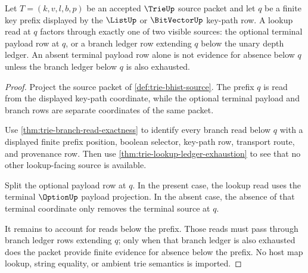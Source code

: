 \begin{theorem}\label{thm:trie-lookup-prefix-ledger-factorization}
Let $T=(k,v,l,b,p)$ be an accepted $\TrieUp$ source packet and let $q$ be a
finite key prefix displayed by the $\ListUp$ or $\BitVectorUp$ key-path row.
A lookup read at $q$ factors through exactly one of two visible sources: the
optional terminal payload row at $q$, or a branch ledger row extending $q$
below the unary depth ledger. An absent terminal payload row alone is not
evidence for absence below $q$ unless the branch ledger below $q$ is also
exhausted.
\end{theorem}
\begin{proof}
Project the source packet of \autoref{def:trie-bhist-source}. The prefix $q$
is read from the displayed key-path coordinate, while the optional terminal
payload and branch rows are separate coordinates of the same packet.

Use \autoref{thm:trie-branch-read-exactness} to identify every branch read
below $q$ with a displayed finite prefix position, boolean selector, key-path
row, transport route, and provenance row. Then use
\autoref{thm:trie-lookup-ledger-exhaustion} to see that no other lookup-facing
source is available.

Split the optional payload row at $q$. In the present case, the lookup read
uses the terminal $\OptionUp$ payload projection. In the absent case, the
absence of that terminal coordinate only removes the terminal source at $q$.

It remains to account for reads below the prefix. Those reads must pass
through branch ledger rows extending $q$; only when that branch ledger is also
exhausted does the packet provide finite evidence for absence below the
prefix. No host map lookup, string equality, or ambient trie semantics is
imported.
\end{proof}

